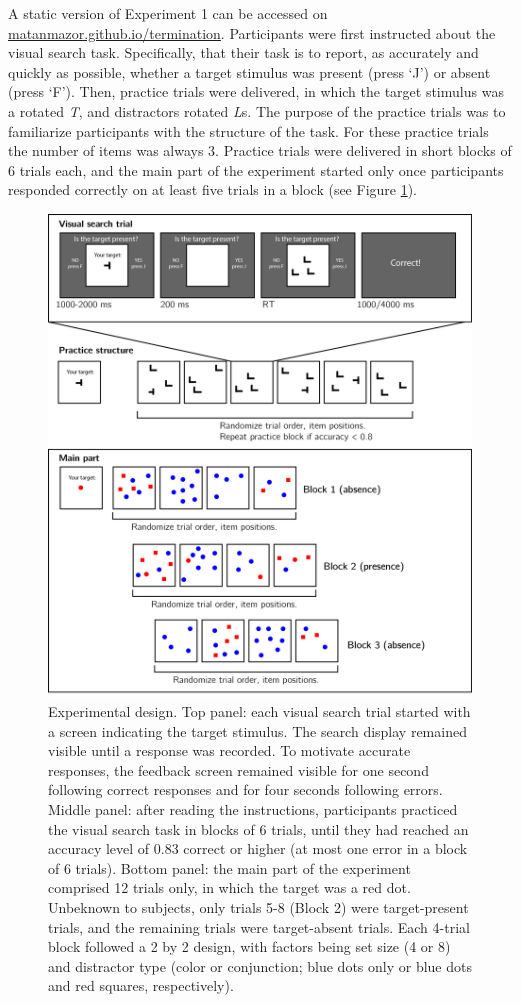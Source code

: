 \documentclass[12pt,twoside]{reedthesis}
\begin{document}
A static version of Experiment 1 can be accessed on \href{matanmazor.github.io/termination/experiments/demos/exp1/}{matanmazor.github.io/termination}. Participants were first instructed about the visual search task. Specifically, that their task is to report, as accurately and quickly as possible, whether a target stimulus was present (press `J') or absent (press `F'). Then, practice trials were delivered, in which the target stimulus was a rotated \emph{T}, and distractors rotated \emph{L}s. The purpose of the practice trials was to familiarize participants with the structure of the task. For these practice trials the number of items was always 3. Practice trials were delivered in short blocks of 6 trials each, and the main part of the experiment started only once participants responded correctly on at least five trials in a block (see Figure \ref{fig:termination-design}).
\begin{figure}
\includegraphics[width=0.6\linewidth]{figure/termination/designExp1} \caption[Search termination without task experience: experimental design.]{Experimental design. Top panel: each visual search trial started with a screen indicating the target stimulus. The search display remained visible until a response was recorded. To motivate accurate responses, the feedback screen remained visible for one second following correct responses and for four seconds following errors. Middle panel: after reading the instructions, participants practiced the visual search task in blocks of 6 trials, until they had reached an accuracy level of 0.83 correct or higher (at most one error in a block of 6 trials). Bottom panel: the main part of the experiment comprised 12 trials only, in which the target was a red dot. Unbeknown to subjects, only trials 5-8 (Block 2) were target-present trials, and the remaining trials were target-absent trials. Each 4-trial block followed a 2 by 2 design, with factors being set size (4 or 8) and distractor type (color or conjunction; blue dots only or blue dots and red squares, respectively).}\label{fig:termination-design}
\end{figure}
\end{document}
